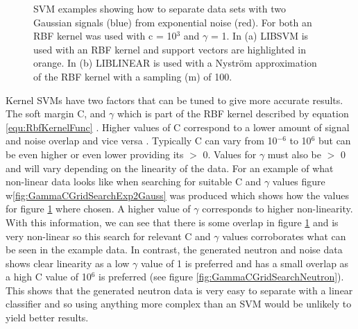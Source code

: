 \begin{figure}[!h]
\begin{subfigure}{.5\textwidth}
  \captionsetup{width=.9\linewidth}
  \caption{}
  \label{subFig:exp_2NysGaussExample}
\end{subfigure}
\caption{SVM examples showing how to separate data sets with two Gaussian signals (blue) from exponential noise (red). For both an RBF kernel was used with c = 10$^3$ and $\gamma$ = 1. In (a) LIBSVM is used with an RBF kernel and support vectors are highlighted in orange. In (b) LIBLINEAR is used with a Nyström approximation of the RBF kernel with a sampling (m) of 100.}
\label{fig:svmExp_GausseExamples}
\end{figure}


Kernel SVMs have two factors that can be tuned to give more accurate results. The soft margin C, and $\gamma$ which is part of the RBF kernel described by equation \ref{equ:RbfKernelFunc} \cite{Boser92atraining}. Higher values of C correspond to a lower amount of signal and noise overlap and vice versa \cite{cortes1995support}. Typically C can vary from 10$^{-6}$ to 10$^6$ but can be even higher or even lower providing its $>$ 0. Values for $\gamma$ must also be $>$ 0 and will vary depending on the linearity of the data. For an example of what non-linear data looks like when searching for suitable C and $\gamma$ values figure w\ref{fig:GammaCGridSearchExp2Gauss} was produced which shows how the values for figure \ref{subFig:exp_2NysGaussExample} where chosen. A higher value of $\gamma$ corresponds to higher non-linearity. With this information, we can see that there is some overlap in figure \ref{subFig:exp_2NysGaussExample} and is very non-linear so this search for relevant C and $\gamma$ values corroborates what can be seen in the example data. In contrast, the generated neutron and noise data shows clear linearity as a low $\gamma$ value of 1 is preferred and has a small overlap as a high C value of 10$^6$ is preferred (see figure \ref{fig:GammaCGridSearchNeutron}). This shows that the generated neutron data is very easy to separate with a linear classifier and so using anything more complex than an SVM would be unlikely to yield better results.

